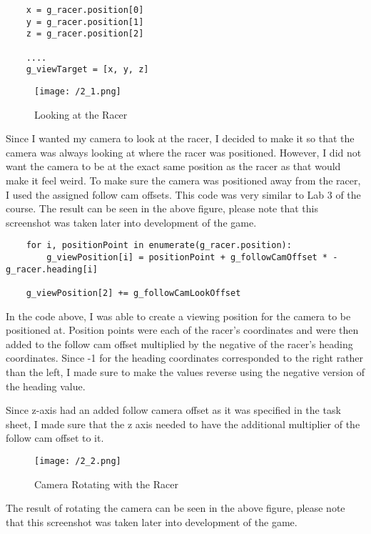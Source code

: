 \documentclass[11pt, oneside, a4paper]{article}
\begin{document}
\begin{lstlisting}  
    x = g_racer.position[0]
    y = g_racer.position[1]
    z = g_racer.position[2]

    ....
    g_viewTarget = [x, y, z]
\end{lstlisting}

\begin{figure}[!ht]
	\centerline{\texttt{[image: /2\_1.png]}}
	\caption{Looking at the Racer}
	\label{fig:figure2}
\end{figure}

Since I wanted my camera to look at the racer, I decided to make it so that the camera was always looking at where the racer was positioned. However, I did not want the camera to be at the exact same position as the racer as that would make it feel weird. To make sure the camera was positioned away from the racer, I used the assigned follow cam offsets. This code was very similar to Lab 3 of the course. The result can be seen in the above figure, please note that this screenshot was taken later into development of the game.

\begin{lstlisting}  
    for i, positionPoint in enumerate(g_racer.position): 
        g_viewPosition[i] = positionPoint + g_followCamOffset * -g_racer.heading[i]

    g_viewPosition[2] += g_followCamLookOffset
\end{lstlisting}
In the code above, I was able to create a viewing position for the camera to be positioned at. Position points were each of the racer's coordinates and were then added to the follow cam offset multiplied by the negative of the racer's heading coordinates. Since -1 for the heading coordinates corresponded to the right rather than the left, I made sure to make the values reverse using the negative version of the heading value.

Since z-axis had an added follow camera offset as it was specified in the task sheet, I made sure that the z axis needed to have the additional multiplier of the follow cam offset to it.

\begin{figure}[!ht]
	\centerline{\texttt{[image: /2\_2.png]}}
	\caption{Camera Rotating with the Racer}
	\label{fig:figure2}
\end{figure}
The result of rotating the camera can be seen in the above figure, please note that this screenshot was taken later into development of the game.
\end{document}
